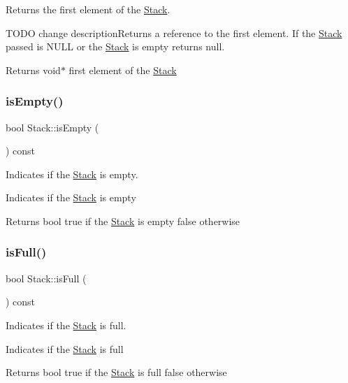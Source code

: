 Returns the first element of the \hyperlink{class_stack}{Stack}. 

T\+O\+DO change description\+Returns a reference to the first element. If the \hyperlink{class_stack}{Stack} passed is N\+U\+LL or the \hyperlink{class_stack}{Stack} is empty returns null.

\begin{DoxyReturn}{Returns}
void$\ast$ first element of the \hyperlink{class_stack}{Stack} 
\end{DoxyReturn}
\mbox{\label{class_stack_a8b137edba711ed0250dccf9ecdd52971}} 
\subsubsection{\texorpdfstring{is\+Empty()}{isEmpty()}}
{\footnotesize\ttfamily bool Stack\+::is\+Empty (\begin{DoxyParamCaption}{ }\end{DoxyParamCaption}) const}



Indicates if the \hyperlink{class_stack}{Stack} is empty. 

Indicates if the \hyperlink{class_stack}{Stack} is empty

\begin{DoxyReturn}{Returns}
bool true if the \hyperlink{class_stack}{Stack} is empty false otherwise 
\end{DoxyReturn}
\mbox{\label{class_stack_a1b7baacfc1eabbb0554852a4ea02618d}} 
\subsubsection{\texorpdfstring{is\+Full()}{isFull()}}
{\footnotesize\ttfamily bool Stack\+::is\+Full (\begin{DoxyParamCaption}{ }\end{DoxyParamCaption}) const}



Indicates if the \hyperlink{class_stack}{Stack} is full. 

Indicates if the \hyperlink{class_stack}{Stack} is full

\begin{DoxyReturn}{Returns}
bool true if the \hyperlink{class_stack}{Stack} is full false otherwise 
\end{DoxyReturn}
\mbox{\label{class_stack_af1b623c6719cf5d7ef22a73117fcd88f}} 
